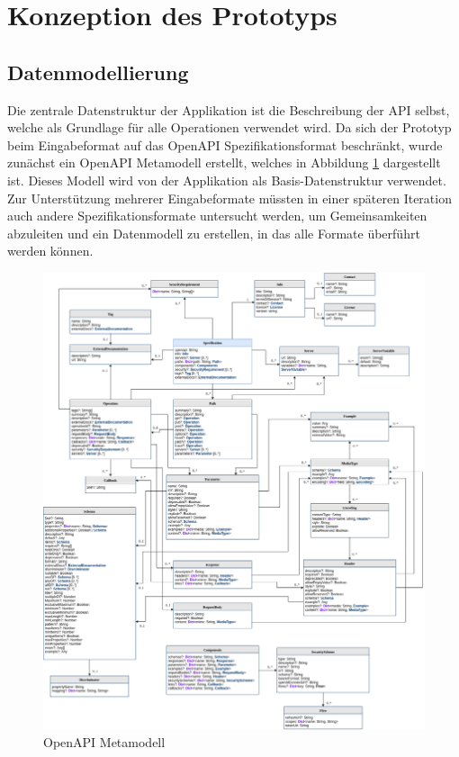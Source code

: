 
\section{Konzeption des Prototyps}


\subsection{Datenmodellierung}

Die zentrale Datenstruktur der Applikation ist die Beschreibung der API selbst, welche als Grundlage für alle Operationen verwendet wird. Da sich der Prototyp beim Eingabeformat auf das OpenAPI Spezifikationsformat beschränkt, wurde zunächst ein OpenAPI Metamodell erstellt, welches in Abbildung \ref{fig:openapi} dargestellt ist. Dieses Modell wird von der Applikation als Basis-Datenstruktur verwendet. Zur Unterstützung mehrerer Eingabeformate müssten in einer späteren Iteration auch andere Spezifikationsformate untersucht werden, um Gemeinsamkeiten abzuleiten und ein Datenmodell zu erstellen, in das alle Formate überführt werden können. \\

\begin{figure}
  \includegraphics[width=\textwidth,height=\textheight,keepaspectratio]{../images/open-api.png}
  \caption{OpenAPI Metamodell}
  \label{fig:openapi}
\end{figure}

